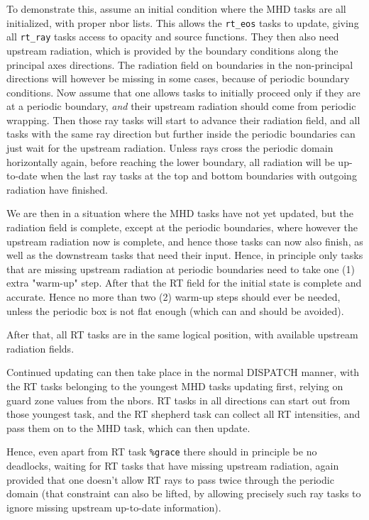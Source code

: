 \documentclass[paper=a4,fontsize=11pt]{scrartcl}
\numberwithin{equation}{section}		%
\numberwithin{figure}{section}			%
\numberwithin{table}{section}				%
\begin{document}
To demonstrate this, assume an initial condition where the MHD tasks are all initialized, with proper nbor lists.  This allows the \verb|rt_eos| tasks to update, giving all \verb|rt_ray| tasks access to opacity and source functions.  They then also need upstream radiation, which is provided by the boundary conditions along the principal axes directions.  The radiation field on boundaries in the non-principal directions will however be missing in some cases, because of periodic boundary conditions.  Now assume that one allows tasks to initially proceed only if they are at a periodic boundary, \textit{and} their upstream radiation should come from periodic wrapping.   Then those ray tasks will start to advance their radiation field, and all tasks with the same ray direction but further inside the periodic boundaries can just wait for the upstream radiation.  Unless rays cross the periodic domain horizontally again, before reaching the lower boundary, all radiation will be up-to-date when the last ray tasks at the top and bottom boundaries with outgoing radiation have finished.

We are then in a situation where the MHD tasks have not yet updated, but the radiation field is complete, except at the periodic boundaries, where however the upstream radiation now is complete, and hence those tasks can now also finish, as well as the downstream tasks that need their input.  Hence, in principle only tasks that are missing upstream radiation at periodic boundaries need to take one (1) extra "warm-up" step.  After that the RT field for the initial state is complete and accurate.  Hence no more than two (2) warm-up steps should ever be needed, unless the periodic box is not flat enough (which can and should be avoided).

After that, all RT tasks are in the same logical position, with available upstream radiation fields.

Continued updating can then take place in the normal DISPATCH manner, with the RT tasks belonging to the  youngest MHD tasks updating first, relying on guard zone values from the nbors.  RT tasks in all directions can start out from those youngest task, and the RT shepherd task can collect all RT intensities, and pass them on to the MHD task, which can then update.

Hence, even apart from RT task \verb|%grace| there should in principle be no deadlocks, waiting for RT tasks that have missing upstream radiation, again provided that one doesn't allow RT rays to pass twice through the periodic domain (that constraint can also be lifted, by allowing precisely such ray tasks to ignore missing upstream up-to-date information).
\end{document}
